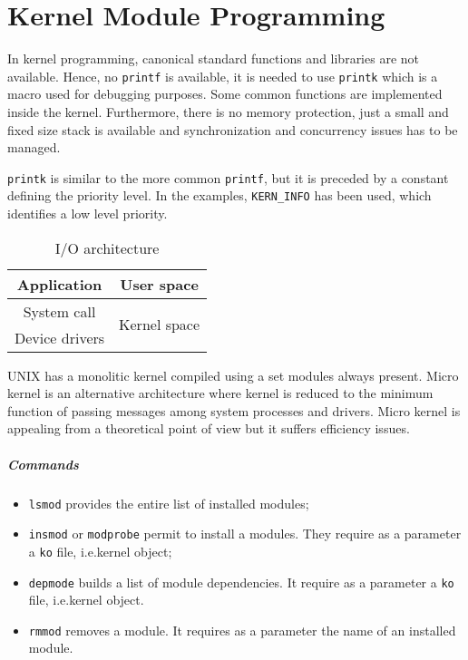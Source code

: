 \chapter{Kernel Module Programming}
In kernel programming, canonical standard functions and libraries are not available. Hence, no \texttt{printf} is available, it is needed to use \texttt{printk} which is a macro used for debugging purposes. Some common functions are implemented inside the kernel. Furthermore, there is no memory protection, just a small and fixed size stack is available and synchronization and concurrency issues has to be managed.

\texttt{printk} is similar to the more common \texttt{printf}, but it is preceded by a constant defining the priority level. In the examples, \texttt{KERN\_INFO} has been used, which identifies a low level priority.

\begin{table}
\centering
\begin{tabular}{|c|c|}
\hline 
Application & User space \\
\hline 
System call & \multirow{2}{*}{Kernel space} \\
Device drivers & \\
\hline 
\end{tabular}
\caption{I/O architecture}
\label{tab:io_architecture}
\end{table} 

UNIX has a monolitic kernel compiled using a set modules always present. Micro kernel is an alternative architecture where kernel is reduced to the minimum function of passing messages among system processes and drivers. Micro kernel is appealing from a theoretical point of view but it suffers efficiency issues.

\paragraph{Commands}
\begin{itemize}
\item \texttt{lsmod} provides the entire list of installed modules;
\item \texttt{insmod} or \texttt{modprobe} permit to install a modules. They require as a parameter a \texttt{ko} file, i.e.\@ kernel object;
\item \texttt{depmode} builds a list of module dependencies. It require as a parameter a \texttt{ko} file, i.e.\@ kernel object.
\item \texttt{rmmod} removes a module.  It requires as a parameter the name of an installed module.
\end{itemize}

